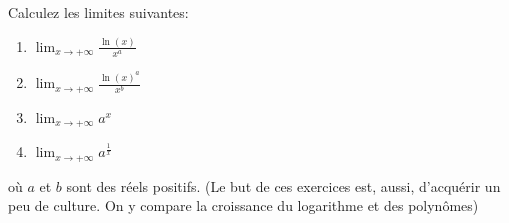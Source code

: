 
\begin{exercice}\label{exo0025}

Calculez les limites suivantes:
\begin{enumerate}
	\item  $\lim_{x \rightarrow  +\infty} \frac{\ln(x)}{x ^a} $
	\item  $\lim_{x \rightarrow  +\infty} \frac{\ln(x)^a}{x ^b} $
	\item  $\lim_{x \rightarrow  +\infty} a ^x $
	\item  $\lim_{x \rightarrow  +\infty} a ^\frac{1}{x} $
\end{enumerate}
où $a$ et $b$ sont des réels positifs.
%
(Le but de ces exercices est, aussi, d'acquérir un peu de culture. On y compare la croissance du logarithme et des polynômes)
%


\end{exercice}
